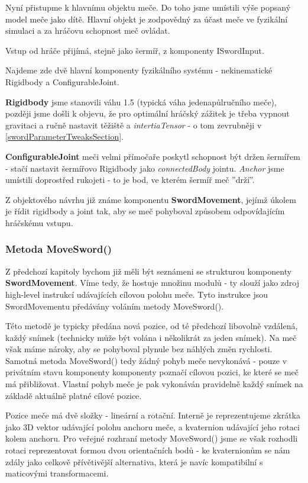 Nyní přistupme k hlavnímu objektu meče. Do toho jsme umístili výše popsaný model meče jako dítě. Hlavní objekt je zodpovědný za účast meče ve fyzikální simulaci a za hráčovu schopnost meč ovládat.

Vstup od hráče přijímá, stejně jako šermíř, z komponenty ISwordInput.

Najdeme zde dvě hlavní komponenty fyzikálního systému - nekinematické Rigidbody a ConfigurableJoint.

\textbf{Rigidbody} jsme stanovili váhu 1.5 (typická váha jedenapůlručního meče), později jsme došli k objevu, že pro optimální hráčský zážitek je třeba vypnout gravitaci a ručně nastavit těžiště a \textit{intertiaTensor} - o tom zevrubněji v \ref{swordParameterTweaksSection}.

\textbf{ConfigurableJoint} meči velmi přímočaře poskytl schopnost být držen šermířem - stačí nastavit šermířovo Rigidbody jako \textit{connectedBody} jointu. \textit{Anchor} jsme umístili doprostřed rukojeti - to je bod, ve kterém šermíř meč ''drží''. 

Z objektového návrhu již známe komponentu \textbf{SwordMovement}, jejímž úkolem je řídit rigidbody a joint tak, aby se meč pohyboval způsobem odpovídajícím hráčskému vstupu.


\subsubsection*{Metoda MoveSword()} \label{swordMovementMoveSwordImplementationSubsection}

Z předchozí kapitoly bychom již měli být seznámeni se strukturou komponenty \textbf{SwordMovement}. Víme tedy, že hostuje množinu modulů - ty slouží jako zdroj high-level instrukcí udávajících cílovou polohu meče. Tyto instrukce jsou SwordMovementu předávány voláním metody MoveSword().

Této metodě je typicky předána nová pozice, od té předchozí libovolně vzdálená, každý snímek (technicky může být volána i několikrát za jeden snímek). Na meč však máme nároky, aby se pohyboval plynule bez náhlých změn rychlosti. Samotná metoda MoveSword() tedy žádný pohyb meče nevykonává - pouze v privátním stavu komponenty komponenty poznačí cílovou pozici, ke které se meč má přibližovat. Vlastní pohyb meče je pak vykonáván pravidelně každý snímek na základě aktuálně platné cílové pozice.

Pozice meče má dvě složky - lineární a rotační. Interně je reprezentujeme zkrátka jako 3D vektor udávající polohu anchoru meče, a kvaternion udávající jeho rotaci kolem anchoru. Pro veřejné rozhraní metody MoveSword() jsme se však rozhodli rotaci reprezentovat formou dvou orientačních bodů - ke kvaternionům se nám zdály jako celkově přívětivější alternativa, která je navíc kompatibilní s maticovými transformacemi.

